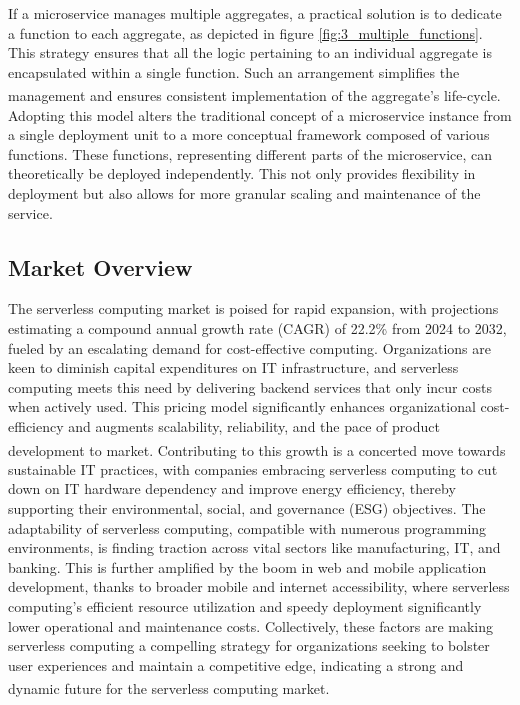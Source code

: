If a microservice manages multiple aggregates, a practical solution is to dedicate a function to
each aggregate, as depicted in figure \ref{fig:3_multiple_functions}. This strategy ensures that all
the logic pertaining to an individual aggregate is encapsulated within a single function. Such an
arrangement simplifies the management and ensures consistent implementation of the aggregate's
life-cycle\textsuperscript{\cite{microservices_book}}. \newline\newline
Adopting this model alters the traditional concept of a microservice instance from a single
deployment unit to a more conceptual framework composed of various functions. These functions,
representing different parts of the microservice, can theoretically be deployed independently. This
not only provides flexibility in deployment but also allows for more granular scaling and
maintenance of the service.

\subsection{Market Overview}
The serverless computing market is poised for rapid expansion, with projections estimating a
compound annual growth rate (CAGR) of 22.2\% from 2024 to 2032, fueled by an escalating demand for
cost-effective computing. Organizations are keen to diminish capital expenditures on IT
infrastructure, and serverless computing meets this need by delivering backend services that only
incur costs when actively used. This pricing model significantly enhances organizational
cost-efficiency and augments scalability, reliability, and the pace of product development to
market\textsuperscript{\cite{serverless_6}}. \newline\newline
Contributing to this growth is a concerted move towards sustainable IT practices, with companies
embracing serverless computing to cut down on IT hardware dependency and improve energy efficiency,
thereby supporting their environmental, social, and governance (ESG) objectives. The adaptability of
serverless computing, compatible with numerous programming environments, is finding traction across
vital sectors like manufacturing, IT, and banking. This is further amplified by the boom in web and
mobile application development, thanks to broader mobile and internet accessibility, where
serverless computing's efficient resource utilization and speedy deployment significantly lower
operational and maintenance costs. Collectively, these factors are making serverless computing a
compelling strategy for organizations seeking to bolster user experiences and maintain a competitive
edge, indicating a strong and dynamic future for the serverless computing
market\textsuperscript{\cite{serverless_6}}.

